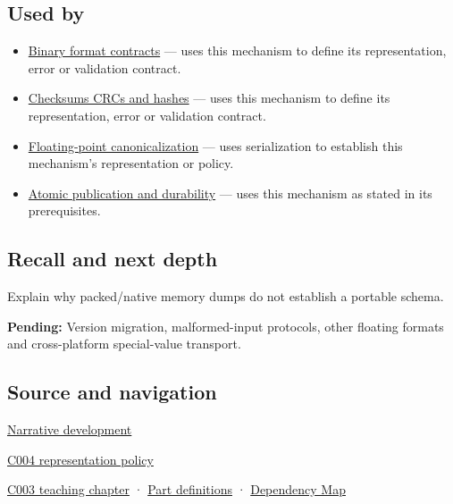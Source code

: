 \subsection{Used by}\label{appendix-91d09ebed979-used-by}

\begin{itemize}
\item
  \hyperref[appendix-590bbb2424c1]{Binary format contracts} --- uses this mechanism to define its representation, error or validation contract.
\item
  \hyperref[appendix-ed338677de0a]{Checksums CRCs and hashes} --- uses this mechanism to define its representation, error or validation contract.
\item
  \hyperref[appendix-e90053a4b201]{Floating-point canonicalization} --- uses serialization to establish this mechanism's representation or policy.
\item
  \hyperref[appendix-e89a8f290ef5]{Atomic publication and durability} --- uses this mechanism as stated in its prerequisites.
\end{itemize}

\subsection{Recall and next depth}\label{appendix-91d09ebed979-recall-and-next-depth}

Explain why packed/native memory dumps do not establish a portable schema.

\textbf{Pending:} Version migration, malformed-input protocols, other floating formats and cross-platform special-value transport.

\subsection{Source and navigation}\label{appendix-91d09ebed979-source-and-navigation}

\hyperref[01-foundations-i-ch002-bytes-become-a-durable-agreement]{Narrative development}

\hyperref[01-foundations-i-ch001-a-stretching-ruler-for-real-valued-quantities]{C004 representation policy}

\hyperref[01-foundations-i-ch002-where-the-bytes-live]{C003 teaching chapter} · \hyperref[appendix-fd090d982a15-m003---parts-41-60]{Part definitions} · \hyperref[appendix-4ad47bdd269a]{Dependency Map}
